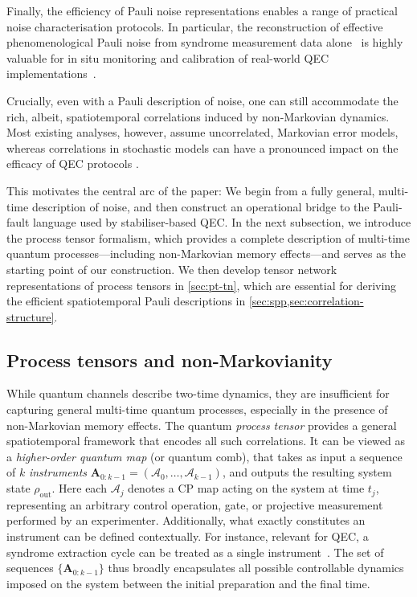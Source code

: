 Finally, the efficiency of Pauli noise representations enables a range of practical noise characterisation protocols. In particular, the reconstruction of effective phenomenological Pauli noise from syndrome measurement data alone~\cite{wagnerOptimalNoiseEstimation2021,wagnerPauliChannelsCan2022,remmExperimentallyInformedDecoding2025} is highly valuable for in situ monitoring and calibration of real-world QEC implementations~\cite{kunjummenSituCalibrationUnitary2025}.

Crucially, even with a Pauli description of noise, one can still accommodate the rich, albeit, spatiotemporal correlations induced by non-Markovian dynamics. Most existing analyses, however, assume uncorrelated, Markovian error models, whereas correlations in stochastic models can have a pronounced impact on the efficacy of QEC protocols \cite{fowlerQuantifyingEffectsLocal2014,fkamDetrimentalNonMarkovianErrors2025}. 

This motivates the central arc of the paper: We begin from a fully general, multi-time description of noise, and then construct an operational bridge to the Pauli-fault language used by stabiliser-based QEC. In the next subsection, we introduce the process tensor formalism, which provides a complete description of multi-time quantum processes---including non-Markovian memory effects---and serves as the starting point of our construction. We then develop tensor network representations of process tensors in \cref{sec:pt-tn}, which are essential for deriving the efficient spatiotemporal Pauli descriptions in \cref{sec:spp,sec:correlation-structure}.

\subsection{Process tensors and non-Markovianity}\label{sec:process_tensors}
While quantum channels describe two-time dynamics, they are insufficient for capturing general multi-time quantum processes, especially in the presence of non-Markovian memory effects. The quantum \emph{process tensor} provides a general spatiotemporal framework that encodes all such correlations. It can be viewed as a \emph{higher-order quantum map} (or quantum comb), that takes as input a sequence of \(k\) \emph{instruments} \(\mathbf{A}_{0:k-1}=(\mathcal{A}_0,\dots,\mathcal{A}_{k-1})\), and outputs the resulting system state \(\rho_\mathrm{out}\). Here each \(\mathcal{A}_j\) denotes a CP map acting on the system at time \(t_j\), representing an arbitrary control operation, gate, or projective measurement performed by an experimenter. Additionally, what exactly constitutes an instrument can be defined contextually. For instance, relevant for QEC, a syndrome extraction cycle can be treated as a single instrument~\cite{tanggaraStrategicCodeUnified2024,kobayashiTensornetworkDecodersProcess2024}. The set of sequences \(\{\mathbf{A}_{0:k-1}\}\) thus broadly encapsulates all possible controllable dynamics imposed on the system between the initial preparation and the final time.


